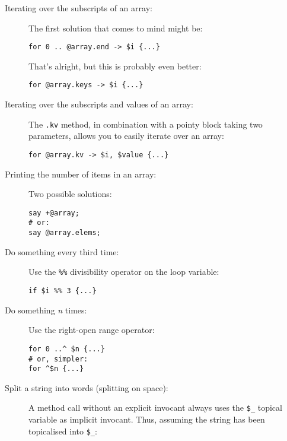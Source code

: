 \begin{description}
\item[Iterating over the subscripts of an array:] The first 
solution that comes to mind might be:

\begin{verbatim}
for 0 .. @array.end -> $i {...}
\end{verbatim}

That's alright, but this is probably even better:

\begin{verbatim}
for @array.keys -> $i {...}
\end{verbatim}

\item[Iterating over the subscripts and values of an array:] 
The \verb'.kv' method, in combination with a pointy block 
taking two parameters, allows you to easily iterate over an 
array:

\begin{verbatim}
for @array.kv -> $i, $value {...}
\end{verbatim}


\item[Printing the number of items in an array:] Two possible 
solutions:

\begin{verbatim}
say +@array; 
# or:
say @array.elems; 
\end{verbatim}

\item[Do something every third time:] Use the \verb'%%' 
divisibility operator on the loop variable:
\begin{verbatim}
if $i %% 3 {...}  
\end{verbatim}

\item[Do something \emph{n} times:] Use the right-open range operator:

\begin{verbatim}
for 0 ..^ $n {...}
# or, simpler:
for ^$n {...} 
\end{verbatim}

\item[Split a string into words (splitting on space):] 
A method call without an explicit invocant always uses 
the \verb'$_' topical variable as implicit invocant. Thus, 
assuming the string has been topicalised into \verb'$_':


\end{description}
